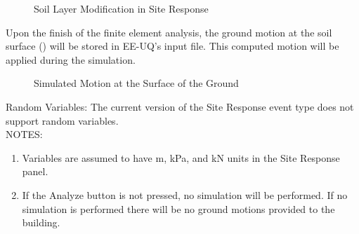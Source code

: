 \begin{figure}[!htbp]
  \caption{Soil Layer Modification in Site Response }
  \label{fig:s3hark3}
\end{figure}

Upon the finish of the finite element analysis, the ground motion at the soil surface () will be stored in EE-UQ's input file.
This computed motion will be applied during the simulation.

\begin{figure}[!htbp]
  \caption{Simulated Motion at the Surface of the Ground}
  \label{fig:s3hark4}
\end{figure}

Random Variables: The current version of the Site Response event type does not support random variables.\\

NOTES: 
\begin{enumerate}
\item Variables are assumed to have m, kPa, and kN units in the Site Response panel.
\item If the Analyze button is not pressed, no simulation will be performed. If no simulation is performed there will be no ground motions provided to the building.
\end{enumerate}



